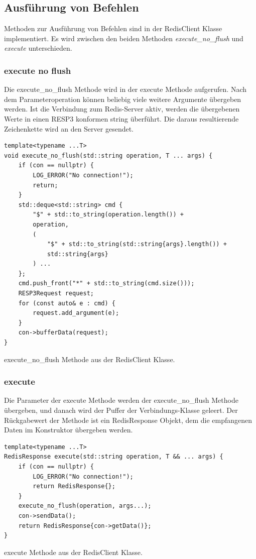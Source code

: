 \documentclass[12pt, letterpaper]{article}
\newenvironment{code}{\captionsetup{type=listing}}{}
\begin{document}
\subsection{Ausführung von Befehlen}
Methoden zur Ausführung von Befehlen sind in der RedisClient Klasse implementiert. Es wird zwischen den beiden Methoden \textit{execute\_no\_flush} und \textit{execute} unterschieden.
\subsubsection{execute no flush}
Die execute\_no\_flush Methode wird in der execute Methode aufgerufen. Nach dem Parameteroperation können beliebig viele weitere Argumente übergeben werden. Ist die Verbindung zum Redis-Server aktiv, werden die übergebenen Werte in einen RESP3 konformen string überführt. Die daraus resultierende Zeichenkette wird an den Server gesendet.

\begin{code}
\begin{verbatim}
template<typename ...T>
void execute_no_flush(std::string operation, T ... args) {
    if (con == nullptr) {
        LOG_ERROR("No connection!");
        return;
    } 
    std::deque<std::string> cmd {
        "$" + std::to_string(operation.length()) +
        operation,
        (
            "$" + std::to_string(std::string{args}.length()) +
            std::string{args}
        ) ...
    };
    cmd.push_front("*" + std::to_string(cmd.size()));
    RESP3Request request;
    for (const auto& e : cmd) {
        request.add_argument(e);
    }
    con->bufferData(request);
}
\end{verbatim}
\caption{execute\_no\_flush Methode aus der RedisClient Klasse.}
\label{resolve_domain}
\end{code}

\subsubsection{execute}
Die Parameter der execute Methode werden der execute\_no\_flush Methode übergeben, und danach wird der Puffer der Verbindungs-Klasse geleert.
Der Rückgabewert der Methode ist ein RedisResponse Objekt, dem die empfangenen Daten im Konstruktor übergeben werden.

\begin{code}
\begin{verbatim}
template<typename ...T>
RedisResponse execute(std::string operation, T && ... args) {
    if (con == nullptr) {
        LOG_ERROR("No connection!");
        return RedisResponse{};
    } 
    execute_no_flush(operation, args...);
    con->sendData();
    return RedisResponse{con->getData()};
}
\end{verbatim}
\caption{execute Methode aus der RedisClient Klasse.}
\label{resolve_domain}
\end{code}
\end{document}
